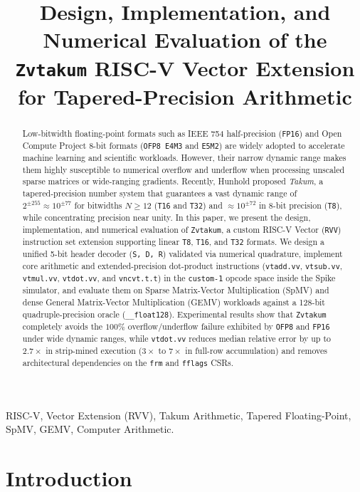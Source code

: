 \documentclass[conference]{IEEEtran}
\title{Design, Implementation, and Numerical Evaluation of the \texttt{Zvtakum} RISC-V Vector Extension for Tapered-Precision Arithmetic}
\author{
\IEEEauthorblockN{Rafael Estev\~ao and Glaucia Marques Figueiredo}
\IEEEauthorblockA{Departamento de Engenharia Eletr\^onica (DELT) --- Universidade Federal de Minas Gerais (UFMG)\\
Belo Horizonte, MG, Brazil\\
Email: rafaelestevao@ufmg.com, figueiredoglaucia56@gmail.com}
}
\begin{document}
\maketitle

\begin{abstract}
Low-bitwidth floating-point formats such as IEEE 754 half-precision (\texttt{FP16}) and Open Compute Project 8-bit formats (\texttt{OFP8 E4M3} and \texttt{E5M2}) are widely adopted to accelerate machine learning and scientific workloads. However, their narrow dynamic range makes them highly susceptible to numerical overflow and underflow when processing unscaled sparse matrices or wide-ranging gradients. Recently, Hunhold proposed \emph{Takum}, a tapered-precision number system that guarantees a vast dynamic range of $2^{\pm 255} \approx 10^{\pm 77}$ for bitwidths $N \ge 12$ (\texttt{T16} and \texttt{T32}) and $\approx 10^{\pm 72}$ in 8-bit precision (\texttt{T8}), while concentrating precision near unity. In this paper, we present the design, implementation, and numerical evaluation of \texttt{Zvtakum}, a custom RISC-V Vector (\texttt{RVV}) instruction set extension supporting linear \texttt{T8}, \texttt{T16}, and \texttt{T32} formats. We design a unified 5-bit header decoder (\texttt{S, D, R}) validated via numerical quadrature, implement core arithmetic and extended-precision dot-product instructions (\texttt{vtadd.vv}, \texttt{vtsub.vv}, \texttt{vtmul.vv}, \texttt{vtdot.vv}, and \texttt{vncvt.t.t}) in the \texttt{custom-1} opcode space inside the Spike simulator, and evaluate them on Sparse Matrix-Vector Multiplication (SpMV) and dense General Matrix-Vector Multiplication (GEMV) workloads against a 128-bit quadruple-precision oracle (\texttt{\_\_float128}). Experimental results show that \texttt{Zvtakum} completely avoids the $100\%$ overflow/underflow failure exhibited by \texttt{OFP8} and \texttt{FP16} under wide dynamic ranges, while \texttt{vtdot.vv} reduces median relative error by up to $2.7\times$ in strip-mined execution ($3\times$ to $7\times$ in full-row accumulation) and removes architectural dependencies on the \texttt{frm} and \texttt{fflags} CSRs.
\end{abstract}

\begin{IEEEkeywords}
RISC-V, Vector Extension (RVV), Takum Arithmetic, Tapered Floating-Point, SpMV, GEMV, Computer Arithmetic.
\end{IEEEkeywords}

\section{Introduction}
\label{sec:intro}
\end{document}
